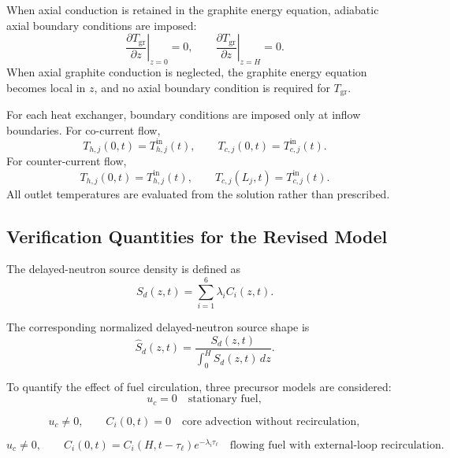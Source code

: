 \documentclass[a4paper,12pt]{article}
\begin{document}
When axial conduction is retained in the graphite energy equation,
adiabatic axial boundary conditions are imposed:
\[
\left.\frac{\partial T_{\mathrm{gr}}}{\partial z}\right|_{z=0}=0,
\qquad
\left.\frac{\partial T_{\mathrm{gr}}}{\partial z}\right|_{z=H}=0.
\]
When axial graphite conduction is neglected, the graphite energy equation
becomes local in $z$, and no axial boundary condition is required for
$T_{\mathrm{gr}}$.

For each heat exchanger, boundary conditions are imposed only at inflow
boundaries. For co-current flow,
\[
T_{h,j}(0,t)=T_{h,j}^{\mathrm{in}}(t),
\qquad
T_{c,j}(0,t)=T_{c,j}^{\mathrm{in}}(t).
\]
For counter-current flow,
\[
T_{h,j}(0,t)=T_{h,j}^{\mathrm{in}}(t),
\qquad
T_{c,j}(L_j,t)=T_{c,j}^{\mathrm{in}}(t).
\]
All outlet temperatures are evaluated from the solution rather than
prescribed.

\subsection{Verification Quantities for the Revised Model}

The delayed-neutron source density is defined as
\begin{equation}
S_d(z,t)
=
\sum_{i=1}^{6}
\lambda_i C_i(z,t).
\label{eq:delayed_source_density}
\end{equation}

The corresponding normalized delayed-neutron source shape is
\begin{equation}
\widehat{S}_d(z,t)
=
\frac{
S_d(z,t)
}{
\displaystyle
\int_{0}^{H}
S_d(z,t)\,dz
}.
\label{eq:normalized_delayed_source}
\end{equation}

To quantify the effect of fuel circulation, three precursor models are
considered:
\begin{equation}
u_c=0
\quad
\text{stationary fuel},
\label{eq:stationary_fuel_case}
\end{equation}

\begin{equation}
u_c\neq 0,
\qquad
C_i(0,t)=0
\quad
\text{core advection without recirculation},
\label{eq:advection_no_recirculation_case}
\end{equation}

\begin{equation}
u_c\neq 0,
\qquad
C_i(0,t)=C_i(H,t-\tau_\ell)e^{-\lambda_i\tau_\ell}
\quad
\text{flowing fuel with external-loop recirculation}.
\label{eq:advection_recirculation_case}
\end{equation}
\end{document}
